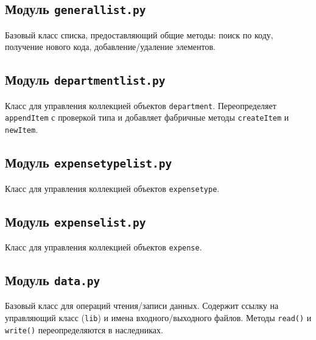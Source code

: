 \documentclass[14pt,a4paper]{extreport}
\begin{document}
\subsection{Модуль \texttt{generallist.py}}

Базовый класс списка, предоставляющий общие методы: поиск по коду, получение нового кода, добавление/удаление элементов.



\subsection{Модуль \texttt{departmentlist.py}}

Класс для управления коллекцией объектов \texttt{department}. Переопределяет \texttt{appendItem} с проверкой типа и добавляет фабричные методы \texttt{createItem} и \texttt{newItem}.



\subsection{Модуль \texttt{expensetypelist.py}}

Класс для управления коллекцией объектов \texttt{expensetype}.



\subsection{Модуль \texttt{expenselist.py}}

Класс для управления коллекцией объектов \texttt{expense}.



\subsection{Модуль \texttt{data.py}}

Базовый класс для операций чтения/записи данных. Содержит ссылку на управляющий класс (\texttt{lib}) и имена входного/выходного файлов. Методы \texttt{read()} и \texttt{write()} переопределяются в наследниках.
\end{document}
